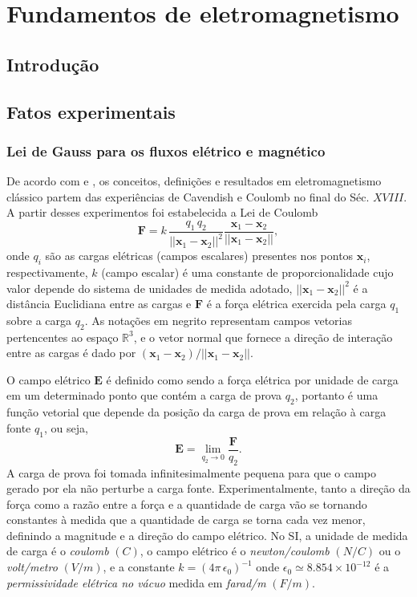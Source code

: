 \chapter{Fundamentos de eletromagnetismo}\label{sec.fund_eletr}

\section{Introdução}

\section{Fatos experimentais}

\subsection{Lei de Gauss para os fluxos elétrico e magnético}\label{sec.lei_gauss}
De acordo com \cite{jackson_classical_1999} e \cite{sommerfeld_52} , os conceitos, definições e resultados em eletromagnetismo clássico partem das experiências de Cavendish e Coulomb no final do Séc. $XVIII$. A partir desses experimentos foi estabelecida a Lei de Coulomb
\begin{equation}\label{eq.forc_elet}
\textbf{F}=k\,\frac{q_1\,q_2}{||\textbf{x}_1-\textbf{x}_2||^2}\frac{\textbf{x}_1-\textbf{x}_2}{||\textbf{x}_1-\textbf{x}_2||},
\end{equation}
onde $q_i$ são as cargas elétricas (campos escalares) presentes nos pontos $\textbf{x}_i$, respectivamente, $k$ (campo escalar) é uma constante de proporcionalidade cujo valor depende do sistema de unidades de medida adotado, $||\textbf{x}_1-\textbf{x}_2||^2$ é a distância Euclidiana entre as cargas e $\textbf{F}$ é a força elétrica exercida pela carga $q_1$ sobre a carga $q_2$. As notações em negrito representam campos vetorias pertencentes ao espaço $\mathbb{R}^3$, e o vetor normal que fornece a direção de interação entre as cargas é dado por $(\textbf{x}_1-\textbf{x}_2)/||\textbf{x}_1-\textbf{x}_2||$.

O campo elétrico $\textbf{E}$ é definido como sendo a força elétrica por unidade de carga em um determinado ponto que contém a carga de prova $q_2$, portanto é uma função vetorial que depende da posição da carga de prova em relação à carga fonte $q_1$, ou seja,
\begin{equation}\label{eq.camp_elet}
\textbf{E}=\lim_{q_2\to 0}\frac{\textbf{F}}{q_2}.
\end{equation}
A carga de prova foi tomada infinitesimalmente pequena para que o campo gerado por ela não perturbe a carga fonte. Experimentalmente, tanto a direção da força como a razão entre a força e a quantidade de carga vão se tornando constantes à medida que a quantidade de carga se torna cada vez menor, definindo a magnitude e a direção do campo elétrico. No SI, a unidade de medida de carga é o \textit{coulomb} $(C)$, o campo elétrico é o \textit{newton/coulomb} $(N/C)$ ou o \textit{volt/metro} $(V/m)$, e a constante $k=(4\pi\,\epsilon_0)^{-1}$ onde $\epsilon_0\simeq8.854\times10^{-12}$ é a \textit{permissividade elétrica no vácuo} medida em \textit{farad/m} $(F/m)$.

